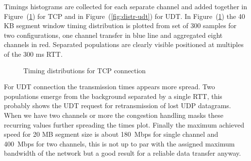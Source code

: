 \documentclass[10pt,a4paper]{article}
\begin{document}
Timings histograms are collected for each separate channel and added together in Figure~(\ref{fig:distr-tcp}) for TCP and in Figure~(\ref{fig:distr-udt}) for UDT.
In Figure~(\ref{fig:distr-tcp}) the 40 KB segment window timing distribution is plotted from set of 300 samples for two configurations, one channel transfer in blue line and aggregated eight channels in red.
Separated populations are clearly visible positioned at multiples of the 300 ms RTT.
~
\begin{figure}[ht]
\centerline{
}
\caption[]
{ Timing distributions for TCP connection }
\label{fig:distr-tcp}
\end{figure}

For UDT connection the transmission times appears more spread.
Two populations emerge from the background separated by a single RTT, this probably shows the UDT request for retransmission of lost UDP datagrams.
When we have two channels or more the congestion handling masks these recurring values further spreading the times plot.
Finally the maximum achieved speed for 20 MB segment size is about 180~Mbps for single channel and 400~Mbps for two channels, this is not up to par with the assigned maximum bandwidth of the network but a good result for a reliable data transfer anyway.
\end{document}
